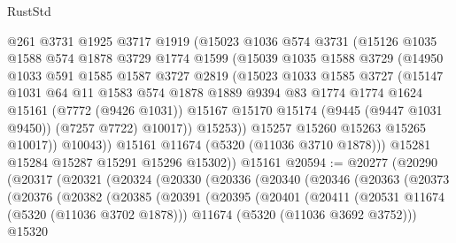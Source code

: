 \begin{lexlean}{RustStd}
\begin{coremodule}
              @261
              @3731
              @1925
              @3717
              @1919
              (@15023
                @1036
                @574
                @3731
                (@15126
                  @1035
                  @1588
                  @574
                  @1878
                  @3729
                  @1774
                  @1599
                  (@15039
                    @1035
                    @1588
                    @3729
                    (@14950
                      @1033
                      @591
                      @1585
                      @1587
                      @3727
                      @2819
                      (@15023
                        @1033
                        @1585
                        @3727
                        (@15147
                          @1031
                          @64
                          @11
                          @1583
                          @574
                          @1878
                          @1889
                          @9394
                          @83
                          @1774
                          @1774
                          @1624
                          @15161
                          (@7772 (@9426 @1031))
                          @15167
                          @15170
                          @15174
                          (@9445 (@9447 @1031 @9450))
                          (@7257 @7722)
                          @10017))
                      @15253))
                  @15257
                  @15260
                  @15263
                  @15265
                  @10017))
              @10043))
          @15161
          @11674
          (@5320 (@11036 @3710 @1878)))
        @15281
        @15284
        @15287
        @15291
        @15296
        @15302))
    @15161
@20594 := @20277
    (@20290
      (@20317
        (@20321
          (@20324
            (@20330
              (@20336
                (@20340
                  (@20346
                    (@20363
                      (@20373
                        (@20376
                          (@20382
                            (@20385
                              (@20391
                                (@20395
                                  (@20401
                                    (@20411
                                      (@20531 @11674 (@5320 (@11036 @3702 @1878)))
                                      @11674
                                      (@5320 (@11036 @3692 @3752)))
                                    @15320

\end{coremodule}
\end{lexlean}
